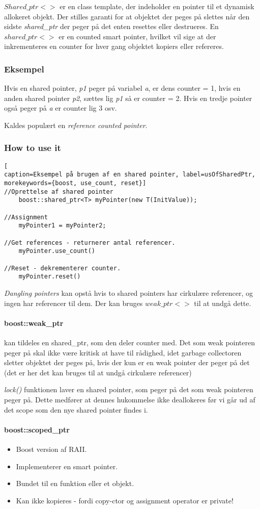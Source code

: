 $Shared\_ptr<>$ er en class template, der indeholder en pointer til et dynamisk allokeret objekt. Der stilles garanti for at objektet der peges på slettes når den sidste \textit{shared\_ptr} der peger på det enten resettes eller destrueres. En $shared\_ptr<>$ er en counted smart pointer, hvilket vil sige at der inkrementeres en counter for hver gang objektet kopiers eller refereres.

\subsubsection{Eksempel}
Hvis en shared pointer, \textit{p1} peger på variabel \textit{a}, er dens counter = 1, hvis en anden shared pointer \textit{p2}, sættes lig \textit{p1} så er counter = 2. Hvis en tredje pointer også peger på \textit{a} er counter lig 3 osv.

Kaldes populært en \textit{reference counted pointer}.

\subsubsection{How to use it}
\begin{lstlisting}[
caption=Eksempel på brugen af en shared pointer, label=usOfSharedPtr,
morekeywords={boost, use_count, reset}]
//Oprettelse af shared pointer
	boost::shared_ptr<T> myPointer(new T(InitValue));

//Assignment
	myPointer1 = myPointer2;
	
//Get references - returnerer antal referencer.
	myPointer.use_count()

//Reset - dekrementerer counter.
	myPointer.reset()
\end{lstlisting}

\textit{Dangling pointers} kan opstå hvis to shared pointers har cirkulære referencer, og ingen har referencer til dem. Der kan bruges $weak\_ptr<>$ til at undgå dette.\\

\paragraph{boost::weak\_ptr}
kan tildeles en shared\_ptr, som den deler counter med.
Det som weak pointeren peger på skal ikke være kritisk at have til rådighed, idet garbage collectoren sletter objektet der peges på, hvis der kun er en weak pointer der peger på det (det er her det kan bruges til at undgå cirkulære referencer)

\textit{lock()} funktionen laver en shared pointer, som peger på det som weak pointeren peger på. Dette medfører at dennes hukommelse ikke deallokeres før vi går ud af det scope som den nye shared pointer findes i.

\paragraph{boost::scoped\_ptr}
\begin{itemize}
	\item Boost version af RAII.
	\item Implementerer en smart pointer.
	\item Bundet til en funktion eller et objekt.
	\item Kan ikke kopieres - fordi copy-ctor og assignment operator er private!
\end{itemize}
